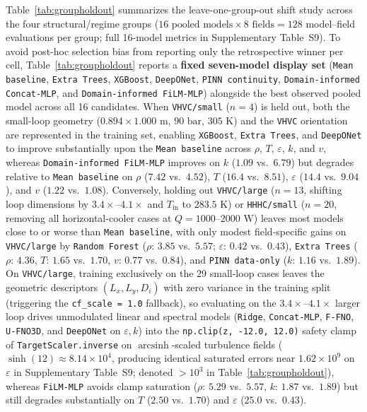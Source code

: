 \documentclass[11pt]{article}
\begin{document}
Table~\ref{tab:groupholdout} summarizes the leave-one-group-out shift study across the four structural/regime groups ($16\text{ pooled models} \times 8\text{ fields} = 128$ model--field evaluations per group; full 16-model metrics in Supplementary Table~S9). To avoid post-hoc selection bias from reporting only the retrospective winner per cell, Table~\ref{tab:groupholdout} reports a \textbf{fixed seven-model display set} (\texttt{Mean baseline}, \texttt{Extra Trees}, \texttt{XGBoost}, \texttt{DeepONet}, \texttt{PINN continuity}, \texttt{Domain-informed Concat-MLP}, and \texttt{Domain-informed FiLM-MLP}) alongside the best observed pooled model across all 16 candidates. When \texttt{VHVC/small} ($n=4$) is held out, both the small-loop geometry ($0.894\times 1.000\text{ m}$, $90\text{ bar}$, $305\text{ K}$) and the \texttt{VHVC} orientation are represented in the training set, enabling \texttt{XGBoost}, \texttt{Extra Trees}, and \texttt{DeepONet} to improve substantially upon the \texttt{Mean baseline} across $\rho$, $T$, $\varepsilon$, $k$, and $v$, whereas \texttt{Domain-informed FiLM-MLP} improves on $k$ ($1.09$ vs.\ $6.79$) but degrades relative to \texttt{Mean baseline} on $\rho$ ($7.42$ vs.\ $4.52$), $T$ ($16.4$ vs.\ $8.51$), $\varepsilon$ ($14.4$ vs.\ $9.04$), and $v$ ($1.22$ vs.\ $1.08$). Conversely, holding out \texttt{VHVC/large} ($n=13$, shifting loop dimensions by $3.4\times\text{--}4.1\times$ and $T_{\mathrm{in}}$ to $283.5\text{ K}$) or \texttt{HHHC/small} ($n=20$, removing all horizontal-cooler cases at $Q=1000\text{--}2000\text{ W}$) leaves most models close to or worse than \texttt{Mean baseline}, with only modest field-specific gains on \texttt{VHVC/large} by \texttt{Random Forest} ($\rho$: $3.85$ vs.\ $5.57$; $\varepsilon$: $0.42$ vs.\ $0.43$), \texttt{Extra Trees} ($\rho$: $4.36$, $T$: $1.65$ vs.\ $1.70$, $v$: $0.77$ vs.\ $0.84$), and \texttt{PINN data-only} ($k$: $1.16$ vs.\ $1.89$). On \texttt{VHVC/large}, training exclusively on the 29 small-loop cases leaves the geometric descriptors $(L_x, L_y, D_i)$ with zero variance in the training split (triggering the \texttt{cf\_scale = 1.0} fallback), so evaluating on the $3.4\times\text{--}4.1\times$ larger loop drives unmodulated linear and spectral models (\texttt{Ridge}, \texttt{Concat-MLP}, \texttt{F-FNO}, \texttt{U-FNO3D}, and \texttt{DeepONet} on $\varepsilon, k$) into the \texttt{np.clip(z, -12.0, 12.0)} safety clamp of \texttt{TargetScaler.inverse} on $\operatorname{arcsinh}$-scaled turbulence fields ($\sinh(12) \approx 8.14\times 10^4$, producing identical saturated errors near $1.62\times 10^9$ on $\varepsilon$ in Supplementary Table~S9; denoted $>\!10^3$ in Table~\ref{tab:groupholdout}), whereas \texttt{FiLM-MLP} avoids clamp saturation ($\rho$: $5.29$ vs.\ $5.57$, $k$: $1.87$ vs.\ $1.89$) but still degrades substantially on $T$ ($2.50$ vs.\ $1.70$) and $\varepsilon$ ($25.0$ vs.\ $0.43$).
\end{document}
